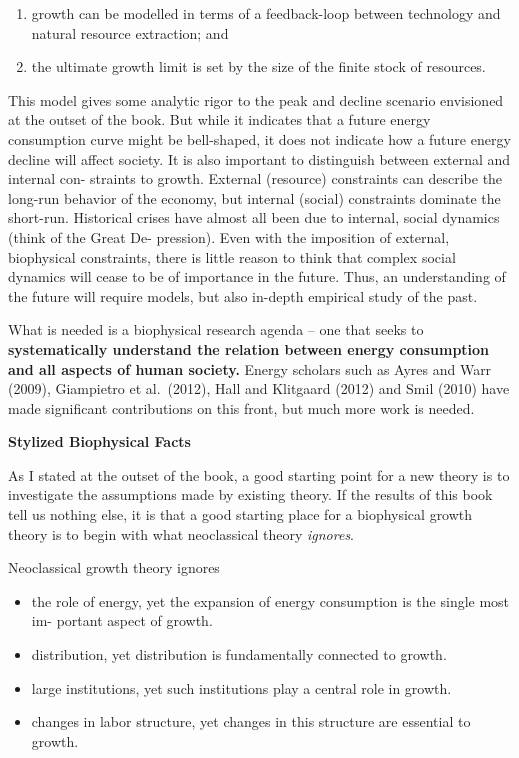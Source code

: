 \documentclass[
]{book}
\begin{document}
\begin{enumerate}
\def\labelenumi{\arabic{enumi})}
\item
  growth can be modelled in terms of a feedback-loop
  between technology and natural resource extraction; and
\item
  the ultimate growth limit
  is set by the size of the finite stock of resources.
\end{enumerate}

This model gives some analytic rigor to the peak and decline scenario envisioned
at the outset of the book. But while it indicates that a future energy consumption
curve might be bell-shaped, it does not indicate how a future energy decline will
affect society. It is also important to distinguish between external and internal con-
straints to growth. External (resource) constraints can describe the long-run behavior
of the economy, but internal (social) constraints dominate the short-run. Historical
crises have almost all been due to internal, social dynamics (think of the Great De-
pression). Even with the imposition of external, biophysical constraints, there is
little reason to think that complex social dynamics will cease to be of importance
in the future. Thus, an understanding of the future will require models, but also
in-depth empirical study of the past.

What is needed is a biophysical research agenda -- one that seeks to \textbf{systematically
understand the relation between energy consumption and all aspects of human
society.} Energy scholars such as Ayres and Warr (2009), Giampietro et al.~(2012),
Hall and Klitgaard (2012) and Smil (2010) have made significant contributions on
this front, but much more work is needed.

\textbf{Stylized Biophysical Facts}

As I stated at the outset of the book, a good starting point for a new theory is to
investigate the assumptions made by existing theory. If the results of this book tell
us nothing else, it is that a good starting place for a biophysical growth theory is
to begin with what neoclassical theory \emph{ignores}.

Neoclassical growth theory ignores

\begin{itemize}
\item
  the role of energy, yet the expansion of energy consumption is the single most im-
  portant aspect of growth.
\item
  distribution, yet distribution is fundamentally connected to growth.
\item
  large institutions, yet such institutions play a central role in growth.
\item
  changes in labor structure, yet changes in this structure are essential to growth.
\end{itemize}
\end{document}
